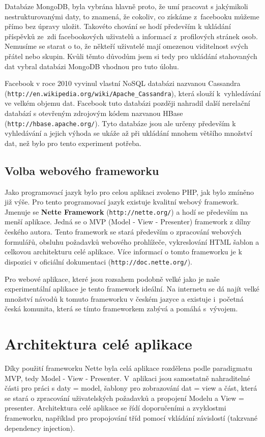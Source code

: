 \documentclass[thesis=M,czech]{FITthesis}[2013/05/10]
\begin{document}
Databáze MongoDB, byla vybrána hlavně proto, že umí pracovat s jakýmikoli nestrukturovanými daty, to znamená, že cokoliv, co získáme z~facebooku můžeme přímo bez úpravy uložit. Takovéto chování se hodí především k ukládání příspěvků ze~zdi facebookových uživatelů a informací z~profilových stránek osob. Nemusíme se starat o to, že někteří uživatelé mají omezenou viditelnost svých přátel nebo skupin. Kvůli těmto důvodům jsem si tedy pro ukládání stahovaných dat vybral databázi MongoDB vhodnou pro tuto úlohu.

Facebook v roce 2010 vyvinul vlastní NoSQL databázi nazvanou Cassandra (\verb|http://en.wikipedia.org/wiki/Apache_Cassandra|), která  slouží k~vyhledávání ve velkém objemu dat. Facebook tuto databázi později nahradil další nerelační databází  s otevřeným zdrojovým kódem nazvanou HBase (\verb|http://hbase.apache.org/|). Tyto databáze jsou ale určeny především k vyhledávání a jejich výhoda se ukáže až při ukládání mnohem většího množství dat, než bylo pro tento experiment potřeba.

\subsection{Volba webového frameworku}

Jako programovací jazyk bylo pro celou aplikaci zvoleno PHP, jak bylo zmíněno již výše. Pro tento programovací jazyk existuje kvalitní webový framework. Jmenuje se \textbf{Nette Framework} (\verb|http://nette.org/|) a hodí se především na menší aplikace. Jedná se o MVP (Model - View - Presenter) framework z dílny českého autora. Tento framework se stará především o zpracování webových formulářů, obsluhu požadavků webového prohlížeče, vykreslování HTML šablon a celkovou architekturu celé aplikace. Více informací o tomto frameworku je k dispozici v oficiální dokumentaci (\verb|http://doc.nette.org/|). 

Pro webové aplikace, které jsou rozsahem podobně velké jako je naše experimentální aplikace je tento framework ideální. Na internetu se dá najít velké množství návodů k tomuto frameworku v českém jazyce a existuje i~početná česká komunita, která se tímto frameworkem zabývá a pomáhá s~vývojem. 


\section{Architektura celé aplikace}

Díky použití frameworku Nette byla celá aplikace rozdělena podle paradigmatu MVP, tedy Model - View - Presenter. V~aplikaci jsou samostatně nahraditelné části pro práci s daty = model, šablony pro zobrazování dat = view a část, která se stará o zpracování uživatelských požadavků a propojení Modelu a View = presenter. Architektura celé aplikace se řídí doporučeními a zvyklostmi frameworku, například pro propojování tříd pomocí vkládání závislostí (takzvané dependency injection).
\end{document}
